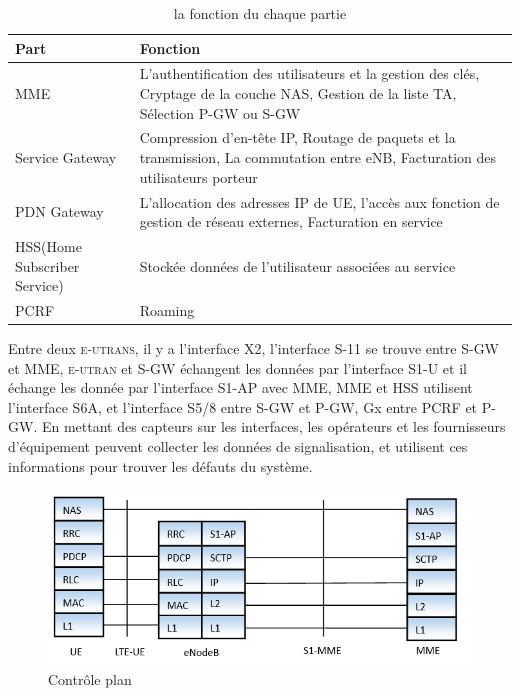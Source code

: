 \begin{table}[H]
	\begin{tabular}{|>{\centering\arraybackslash}p{2cm}|>{\centering\arraybackslash}p{11 cm}|}
		\hline Part &                     Fonction\\
		\hline MME & 
			L'authentification des utilisateurs et la gestion des clés,  Cryptage de la couche NAS,  Gestion de la liste TA, Sélection P-GW ou S-GW \\ 
		\hline Service Gateway & Compression d'en-tête IP, Routage de paquets et la transmission, La commutation entre eNB, Facturation des utilisateurs porteur \\ 
		\hline PDN Gateway & L'allocation des adresses IP de UE, l'accès aux fonction de gestion de réseau externes, Facturation en service \\ 
		\hline HSS(Home Subscriber Service) & Stockée données de l'utilisateur associées au service \\ 
		\hline PCRF & Roaming \\ 
		\hline 
	\end{tabular} 
	\caption{la fonction du chaque partie}
	\label{founction du chaque partie}
\end{table}    

Entre deux \textsc{e-utrans}, il y a l'interface X2, l'interface S-11 se trouve entre S-GW et MME, \textsc{e-utran} et S-GW échangent les données par l'interface S1-U et il échange les donnée par l'interface S1-AP avec MME, MME et HSS utilisent l'interface S6A, et l'interface S5/8 entre S-GW et P-GW, Gx entre PCRF et P-GW. En mettant des capteurs sur les interfaces, les opérateurs et les fournisseurs d'équipement peuvent collecter les données de signalisation, et utilisent ces informations pour trouver les défauts du système. 

\begin{figure}[H]
\centering
\includegraphics[width=0.9\linewidth]{images/s1-mme}
\caption{Contrôle plan}
\label{fig:s1-mme}
\end{figure}

